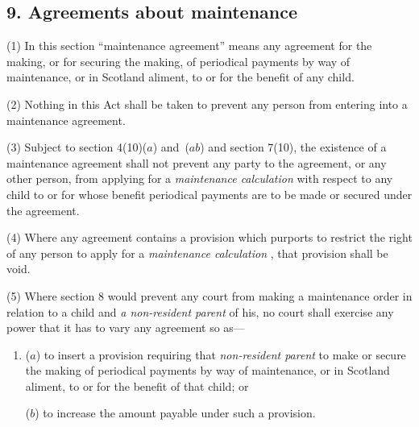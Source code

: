 \documentclass[12pt,a4paper]{article}
\begin{document}
\subsection{9. Agreements about maintenance}

(1) In this section “maintenance agreement” means any agreement for the making, or for securing the making, of periodical payments by way of maintenance, or in Scotland aliment, to or for the benefit of any child.

(2) Nothing in this Act shall be taken to prevent any person from entering into a maintenance agreement.

(3) 
Subject to section 4(10)($a$) 
and~($ab$)  %
and section 7(10),  %
the existence of a maintenance agreement shall not prevent any party to the agreement, or any other person, from applying for a 
\emph{maintenance calculation}  %
with respect to any child to or for whose benefit periodical payments are to be made or secured under the agreement.

(4) Where any agreement contains a provision which purports to restrict the right of any person to apply for a 
\emph{maintenance calculation}%
, that provision shall be void.

(5) Where section 8 would prevent any court from making a maintenance order in relation to a child and 
\emph{a non-resident parent}  %
of his, no court shall exercise any power that it has to vary any agreement so as—
\begin{enumerate}\item[]
($a$) to insert a provision requiring that 
\emph{non-resident parent}  %
to make or secure the making of periodical payments by way of maintenance, or in Scotland aliment, to or for the benefit of that child; or

($b$) to increase the amount payable under such a provision.
\end{enumerate}
\end{document}
